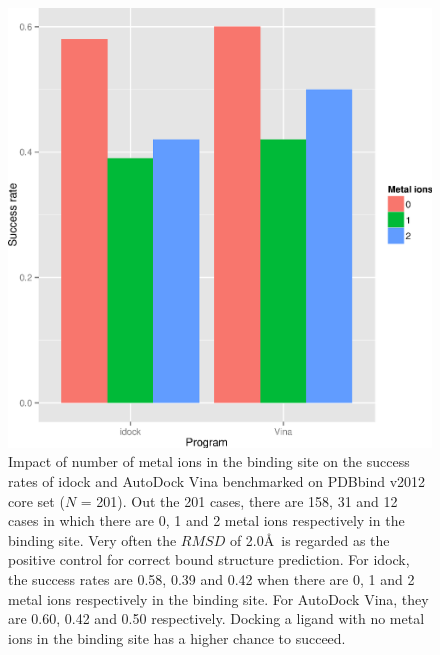 \begin{figure}
\begin{center}
\includegraphics[width=\linewidth]{../istar/Program-NIONS.eps}
\end{center}
\caption{Impact of number of metal ions in the binding site on the success rates of idock and AutoDock Vina benchmarked on PDBbind v2012 core set ($N$ = 201). Out the 201 cases, there are 158, 31 and 12 cases in which there are 0, 1 and 2 metal ions respectively in the binding site. Very often the $RMSD$ of 2.0\AA\ is regarded as the positive control for correct bound structure prediction. For idock, the success rates are 0.58, 0.39 and 0.42 when there are 0, 1 and 2 metal ions respectively in the binding site. For AutoDock Vina, they are 0.60, 0.42 and 0.50 respectively. Docking a ligand with no metal ions in the binding site has a higher chance to succeed.}
\label{istar:Program-NIONS}
\end{figure}

